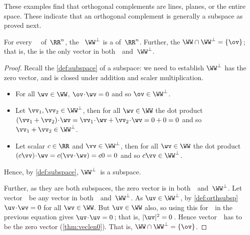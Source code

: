 These examples find that orthogonal complements are lines, planes, or the entire space.  
These indicate that an orthogonal complement is generally a subspace as proved next.

\begin{theorem} \label{thm:perpnull}
For every ~\WW\ of~\(\RR^n\),  the ~\(\WW^\perp\) is a  of~\(\RR^n\).
Further, the  \(\WW\cap\WW^\perp=\{\ov\}\); that is, the  is the only vector in both~\WW\ and~\(\WW^\perp\).
\end{theorem}

\begin{proof} 
Recall the \autoref{def:subspace} of a subspace: we need to establish \(\WW^\perp\) has the zero vector, and is closed under addition and scaler multiplication.
\begin{itemize}
\item For all \(\wv\in\WW\), \(\ov\cdot\wv=0\) and so \(\ov\in\WW^\perp\).
\item Let \(\vv_1,\vv_2\in\WW^\perp\), then for all \(\wv\in\WW\) the dot product  \((\vv_1+\vv_2)\cdot\wv=\vv_1\cdot\wv+\vv_2\cdot\wv=0+0=0\) and so \(\vv_1+\vv_2\in\WW^\perp\).
\item Let scalar \(c\in\RR\) and \(\vv\in\WW^\perp\), then for all \(\wv\in\WW\) the dot product  \((c\vv)\cdot\wv=c(\vv\cdot\wv)=c0=0\) and so \(c\vv\in\WW^\perp\).
\end{itemize}
Hence, by \autoref{def:subspace}, \(\WW^\perp\)~is a subspace.

Further, as they are both subspaces, the zero vector is in both~\WW\ and~\(\WW^\perp\).
Let vector~\uv\ be any vector in both~\WW\ and~\(\WW^\perp\).
As \(\uv\in\WW^\perp\), by \autoref{def:orthsubsp} \(\uv\cdot\wv=0\) for all \(\wv\in\WW\).
But \(\uv\in\WW\) also, so using this for~\wv\ in the previous equation gives \(\uv\cdot\uv=0\)\,; that is, \(|\uv|^2=0\)\,.
Hence vector~\uv\ has to be the zero vector (\autoref{thm:veclen0}).
That is, \(\WW\cap\WW^\perp=\{\ov\}\).
\end{proof}

